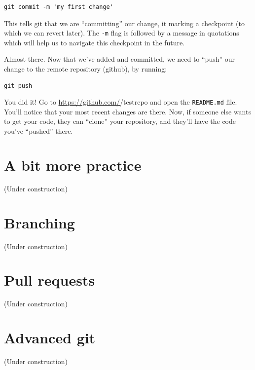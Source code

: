 \documentclass[
]{book}
\begin{document}
\begin{verbatim}
git commit -m 'my first change'
\end{verbatim}

This tells git that we are ``committing'' our change, it marking a checkpoint (to which we can revert later). The \texttt{-m} flag is followed by a message in quotations which will help us to navigate this checkpoint in the future.

Almost there. Now that we've added and committed, we need to ``push'' our change to the remote repository (github), by running:

\begin{verbatim}
git push
\end{verbatim}

You did it! Go to \url{https://github.com/}/testrepo and open the \texttt{README.md} file. You'll notice that your most recent changes are there. Now, if someone else wants to get your code, they can ``clone'' your repository, and they'll have the code you've ``pushed'' there.

\hypertarget{a-bit-more-practice}{%
\section*{A bit more practice}\label{a-bit-more-practice}}

(Under construction)

\hypertarget{branching}{%
\section*{Branching}\label{branching}}

(Under construction)

\hypertarget{pull-requests}{%
\section*{Pull requests}\label{pull-requests}}

(Under construction)

\hypertarget{advanced-git}{%
\section*{Advanced git}\label{advanced-git}}

(Under construction)
\end{document}

